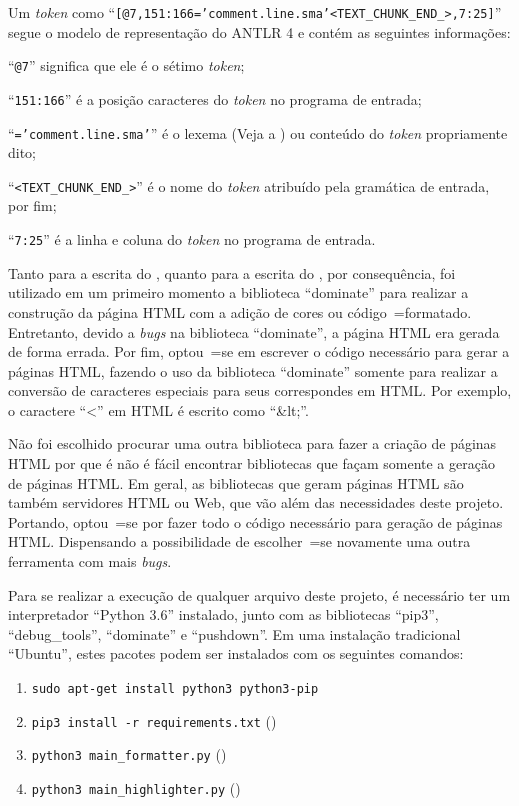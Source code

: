 Um \textit{token} como ``\texttt{[@7,151:166='comment.line.sma'<TEXT_CHUNK_END_>,7:25]}'' segue o modelo de representação do ANTLR 4 \cite{antlrBookTerrentParr} e
contém as seguintes informações:
\begin{inparaenum}[1)]
\item ``\texttt{@7}'' significa que ele é o sétimo \textit{token};
\item ``\texttt{151:166}'' é a posição caracteres do \textit{token} no programa de entrada;
\item ``\texttt{='comment.line.sma'}'' é o lexema (Veja a ) ou
conteúdo do \textit{token} propriamente dito;
\item ``\texttt{<TEXT_CHUNK_END_>}'' é o nome do \textit{token} atribuído pela gramática de entrada,
por fim;
\item ``\texttt{7:25}'' é a linha e
coluna do \textit{token} no programa de entrada.
\end{inparaenum}%

Tanto para a escrita do ,
quanto para a escrita do ,
por consequência,
foi utilizado em um primeiro momento a biblioteca ``dominate'' para realizar a construção da página HTML com a adição de cores ou
código~=formatado. Entretanto,
devido a \textit{bugs} na biblioteca ``dominate'',
a página HTML era gerada de forma errada.
Por fim,
optou~=se em escrever o código necessário para gerar a páginas HTML,
fazendo o uso da biblioteca ``dominate'' somente para realizar a conversão de caracteres especiais para seus correspondes em HTML.
Por exemplo,
o caractere ``<'' em HTML é escrito como ``\&lt;''.

Não foi escolhido procurar uma outra biblioteca para fazer a criação de páginas HTML por que é não é fácil encontrar bibliotecas que façam somente a geração de páginas HTML.
Em geral,
as bibliotecas que geram páginas HTML são também servidores HTML ou
Web,
que vão além das necessidades deste projeto.
Portando,
optou~=se por fazer todo o código necessário para geração de páginas HTML.
Dispensando a possibilidade de escolher~=se novamente uma outra ferramenta com mais \textit{bugs}.

Para se realizar a execução de qualquer arquivo deste projeto,
é necessário ter um interpretador ``Python 3.6'' instalado,
junto com as bibliotecas ``pip3'',
``debug\_tools'', ``dominate'' e
``pushdown''.
Em uma instalação tradicional ``Ubuntu'',
estes pacotes podem ser instalados com os seguintes comandos:
\begin{enumerate}[1)]
\item \texttt{sudo apt-get install python3 python3-pip}
\item \texttt{pip3 install -r requirements.txt} ()
\item \texttt{python3 main_formatter.py} ()
\item \texttt{python3 main_highlighter.py} ()
\end{enumerate}

